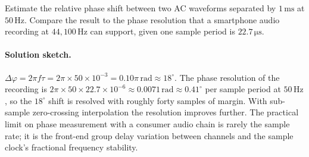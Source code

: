 \begin{exercise}
Estimate the relative phase shift between two AC waveforms separated
by $1 \,\si{\milli\second}$ at $50 \,\si{\hertz}$. Compare the
result to the phase resolution that a smartphone audio recording at
$44{,}100 \,\si{\hertz}$ can support, given one sample period is
$22.7 \,\si{\micro\second}$.

\paragraph{Solution sketch.}
$\Delta \varphi = 2\pi f \tau = 2\pi \times 50 \times 10^{-3} =
0.10\pi \,\si{\radian} \approx 18^{\circ}$. The phase resolution
of the recording is $2\pi \times 50 \times 22.7 \times 10^{-6}
\approx 0.0071 \,\si{\radian} \approx 0.41^{\circ}$ per sample
period at $50 \,\si{\hertz}$, so the $18^{\circ}$ shift is
resolved with roughly forty samples of margin. With sub-sample
zero-crossing interpolation the resolution improves further. The
practical limit on phase measurement with a consumer audio chain
is rarely the sample rate; it is the front-end group delay
variation between channels and the sample clock's fractional
frequency stability.
\end{exercise}

